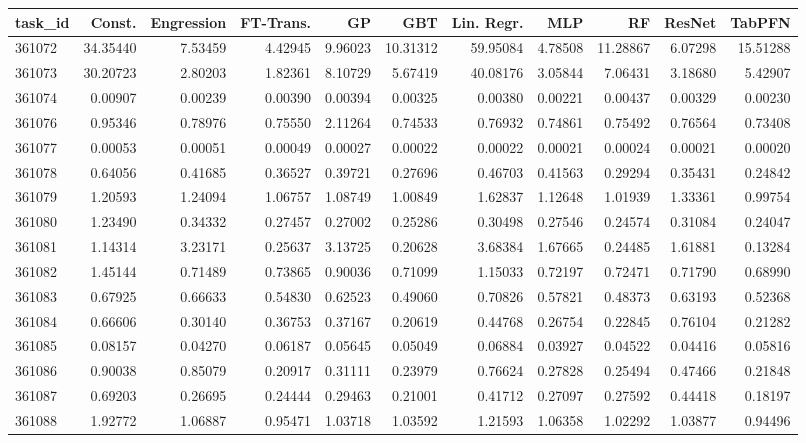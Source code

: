 \begin{tabular}{lrrrrrrrrrr}
\toprule
task\_id & Const. & Engression & FT-Trans. & GP & GBT & Lin. Regr. & MLP & RF & ResNet & TabPFN \\
\midrule
361072 & 34.35440 & 7.53459 & 4.42945 & 9.96023 & 10.31312 & 59.95084 & 4.78508 & 11.28867 & 6.07298 & 15.51288 \\
361073 & 30.20723 & 2.80203 & 1.82361 & 8.10729 & 5.67419 & 40.08176 & 3.05844 & 7.06431 & 3.18680 & 5.42907 \\
361074 & 0.00907 & 0.00239 & 0.00390 & 0.00394 & 0.00325 & 0.00380 & 0.00221 & 0.00437 & 0.00329 & 0.00230 \\
361076 & 0.95346 & 0.78976 & 0.75550 & 2.11264 & 0.74533 & 0.76932 & 0.74861 & 0.75492 & 0.76564 & 0.73408 \\
361077 & 0.00053 & 0.00051 & 0.00049 & 0.00027 & 0.00022 & 0.00022 & 0.00021 & 0.00024 & 0.00021 & 0.00020 \\
361078 & 0.64056 & 0.41685 & 0.36527 & 0.39721 & 0.27696 & 0.46703 & 0.41563 & 0.29294 & 0.35431 & 0.24842 \\
361079 & 1.20593 & 1.24094 & 1.06757 & 1.08749 & 1.00849 & 1.62837 & 1.12648 & 1.01939 & 1.33361 & 0.99754 \\
361080 & 1.23490 & 0.34332 & 0.27457 & 0.27002 & 0.25286 & 0.30498 & 0.27546 & 0.24574 & 0.31084 & 0.24047 \\
361081 & 1.14314 & 3.23171 & 0.25637 & 3.13725 & 0.20628 & 3.68384 & 1.67665 & 0.24485 & 1.61881 & 0.13284 \\
361082 & 1.45144 & 0.71489 & 0.73865 & 0.90036 & 0.71099 & 1.15033 & 0.72197 & 0.72471 & 0.71790 & 0.68990 \\
361083 & 0.67925 & 0.66633 & 0.54830 & 0.62523 & 0.49060 & 0.70826 & 0.57821 & 0.48373 & 0.63193 & 0.52368 \\
361084 & 0.66606 & 0.30140 & 0.36753 & 0.37167 & 0.20619 & 0.44768 & 0.26754 & 0.22845 & 0.76104 & 0.21282 \\
361085 & 0.08157 & 0.04270 & 0.06187 & 0.05645 & 0.05049 & 0.06884 & 0.03927 & 0.04522 & 0.04416 & 0.05816 \\
361086 & 0.90038 & 0.85079 & 0.20917 & 0.31111 & 0.23979 & 0.76624 & 0.27828 & 0.25494 & 0.47466 & 0.21848 \\
361087 & 0.69203 & 0.26695 & 0.24444 & 0.29463 & 0.21001 & 0.41712 & 0.27097 & 0.27592 & 0.44418 & 0.18197 \\
361088 & 1.92772 & 1.06887 & 0.95471 & 1.03718 & 1.03592 & 1.21593 & 1.06358 & 1.02292 & 1.03877 & 0.94496 \\

\end{tabular}
